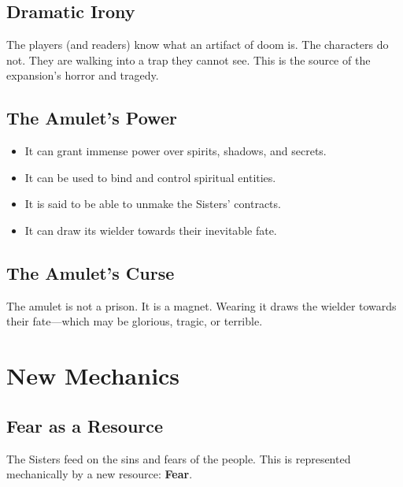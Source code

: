 \documentclass[11pt,twoside]{book}
\begin{document}
\section{Dramatic Irony}

The players (and readers) know what an artifact of doom is. The characters do not. They are walking into a trap they cannot see. This is the source of the expansion's horror and tragedy.

\section{The Amulet's Power}

\begin{itemize}
    \item It can grant immense power over spirits, shadows, and secrets.
    \item It can be used to bind and control spiritual entities.
    \item It is said to be able to unmake the Sisters' contracts.
    \item It can draw its wielder towards their inevitable fate.
\end{itemize}

\section{The Amulet's Curse}

The amulet is not a prison. It is a magnet. Wearing it draws the wielder towards their fate---which may be glorious, tragic, or terrible.

\chapter{New Mechanics}

\section{Fear as a Resource}

The Sisters feed on the sins and fears of the people. This is represented mechanically by a new resource: \textbf{Fear}.
\end{document}
